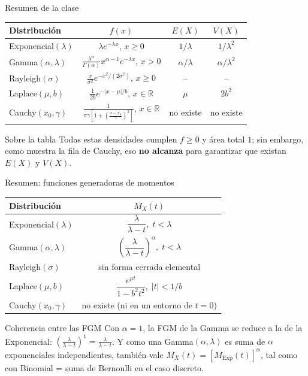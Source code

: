 \documentclass[aspectratio=169,11pt]{beamer}
\begin{document}
\begin{frame}{Resumen de la clase}
\begin{center}
\tiny
\begin{tabular}{lccc}
\toprule
\textbf{Distribución} & \textbf{$f(x)$} & \textbf{$E(X)$} & \textbf{$V(X)$} \\
\midrule
Exponencial$(\lambda)$ & $\lambda e^{-\lambda x}$, $x\ge0$ & $1/\lambda$ & $1/\lambda^2$ \\
Gamma$(\alpha,\lambda)$ & $\frac{\lambda^\alpha}{\Gamma(\alpha)}x^{\alpha-1}e^{-\lambda x}$, $x>0$ & $\alpha/\lambda$ & $\alpha/\lambda^2$ \\
Rayleigh$(\sigma)$ & $\frac{x}{\sigma^2}e^{-x^2/(2\sigma^2)}$, $x\ge0$ & -- & -- \\
Laplace$(\mu,b)$ & $\frac{1}{2b}e^{-|x-\mu|/b}$, $x\in\mathbb{R}$ & $\mu$ & $2b^2$ \\
Cauchy$(x_0,\gamma)$ & $\frac{1}{\pi\gamma[1+(\frac{x-x_0}{\gamma})^2]}$, $x\in\mathbb{R}$ & no existe & no existe \\
\bottomrule
\end{tabular}
\end{center}

\begin{alertblock}{Sobre la tabla}
Todas estas densidades cumplen $f\ge0$ y área total $1$; sin embargo, como muestra la fila de Cauchy, eso \textbf{no alcanza} para garantizar que existan $E(X)$ y $V(X)$.
\end{alertblock}
\end{frame}

\begin{frame}{Resumen: funciones generadoras de momentos}
\begin{center}
\begin{tabular}{lc}
\toprule
\textbf{Distribución} & \textbf{$M_X(t)$} \\
\midrule
Exponencial$(\lambda)$ & $\dfrac{\lambda}{\lambda-t}, \; t<\lambda$ \\
Gamma$(\alpha,\lambda)$ & $\left(\dfrac{\lambda}{\lambda-t}\right)^{\!\alpha}, \; t<\lambda$ \\
Rayleigh$(\sigma)$ & sin forma cerrada elemental \\
Laplace$(\mu,b)$ & $\dfrac{e^{\mu t}}{1-b^2t^2}, \; |t|<1/b$ \\
Cauchy$(x_0,\gamma)$ & no existe (ni en un entorno de $t=0$) \\
\bottomrule
\end{tabular}
\end{center}

\begin{alertblock}{Coherencia entre las FGM}
Con $\alpha=1$, la FGM de la Gamma se reduce a la de la Exponencial: $\left(\frac{\lambda}{\lambda-t}\right)^1=\frac{\lambda}{\lambda-t}$. Y como una Gamma$(\alpha,\lambda)$ es suma de $\alpha$ exponenciales independientes, también vale $M_X(t)=[M_{\text{Exp}}(t)]^\alpha$, tal como con Binomial = suma de Bernoulli en el caso discreto.
\end{alertblock}
\end{frame}
\end{document}
